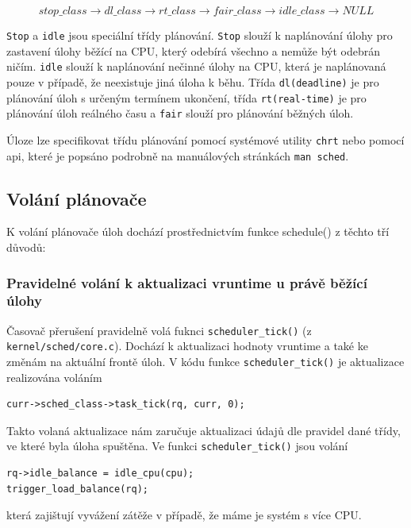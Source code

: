 \documentclass[a4paper,12pt]{article}
\begin{document}
$$ 
stop\_class \rightarrow dl\_class \rightarrow rt\_class \rightarrow fair\_class \rightarrow idle\_class \rightarrow NULL 
$$

\verb#Stop# a \verb#idle# jsou speciální třídy plánování. \verb#Stop# slouží k naplánování úlohy pro zastavení úlohy běžící na CPU, který odebírá všechno a nemůže být odebrán ničím. \verb#idle# slouží k naplánování nečinné úlohy na CPU, která je naplánovaná pouze v případě, že neexistuje jiná úloha k běhu. Třída \verb#dl(deadline)# je pro plánování úloh s určeným termínem ukončení, třída \verb#rt(real-time)# je pro plánování úloh reálného času a \verb#fair# slouží pro plánování běžných úloh.

Úloze lze specifikovat třídu plánování pomocí systémové utility \verb#chrt# nebo pomocí api, které je popsáno podrobně na manuálových stránkách \verb#man sched#.

\subsection{Volání plánovače}

K volání plánovače úloh dochází prostřednictvím funkce schedule() z těchto tří důvodů:

\subsubsection{Pravidelné volání k aktualizaci vruntime u právě běžící úlohy}

Časovač přerušení pravidelně volá fuknci \verb#scheduler_tick()# \linebreak (z \verb#kernel/sched/core.c#). Dochází k aktualizaci hodnoty vruntime a také ke změnám na aktuální frontě úloh.
V kódu funkce \verb#scheduler_tick()# je aktualizace realizována voláním 
\begin{verbatim}
curr->sched_class->task_tick(rq, curr, 0);
\end{verbatim}
Takto volaná aktualizace nám zaručuje aktualizaci údajů dle pravidel dané třídy, ve které byla úloha spuštěna. Ve funkci \verb#scheduler_tick()# jsou volání 
\begin{verbatim}
rq->idle_balance = idle_cpu(cpu);
trigger_load_balance(rq);
\end{verbatim}
která zajištují vyvážení zátěže v případě, že máme je systém s více CPU.
\end{document}
